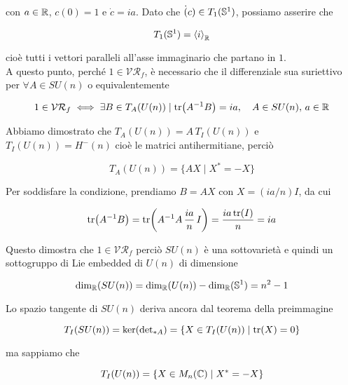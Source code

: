 con $ a \in \R $, $ c(0) = 1 $ e $ \dot{c} = i a $. Dato che $ \dot(c) \in T_{1}(\S^{1}) $, possiamo asserire che

\begin{equation}
	T_{1}(\S^{1}) = \expval{i}_{\R}
\end{equation}

cioè tutti i vettori paralleli all'asse immaginario che partano in $ 1 $.\\
A questo punto, perché $ 1 \in \mathcal{VR}_{f} $, è necessario che il differenziale sua suriettivo per $ \forall A \in SU(n) $ o equivalentemente

\begin{equation}
	1 \in \mathcal{VR}_{f} \iff \exists B \in T_{A}(U(n)) \mid \tr(A^{-1} B) = i a \qcomma A \in SU(n), \, a \in \R
\end{equation}

Abbiamo dimostrato che $ T_{A}(U(n)) = A \, T_{I}(U(n)) $ e $ T_{I}(U(n)) = H^{-}(n) $ cioè le matrici antihermitiane, perciò

\begin{equation}
	T_{A}(U(n)) = \{ AX \mid X^{*} = -X \}
\end{equation}

Per soddisfare la condizione, prendiamo $ B = AX $ con $ X = (i a/n) I $, da cui

\begin{equation}
	\tr(A^{-1} B) = \tr(A^{-1} A \, \dfrac{ia}{n} \, I) = \dfrac{ia \tr(I)}{n} = i a
\end{equation}

Questo dimostra che $ 1 \in \mathcal{VR}_{f} $ perciò $ SU(n) $ è una sottovarietà e quindi un sottogruppo di Lie embedded di $ U(n) $ di dimensione

\begin{equation}
	\dim_{\R}(SU(n)) = \dim_{\R}(U(n)) - \dim_{\R}(\S^{1}) = n^{2} - 1
\end{equation}

Lo spazio tangente di $ SU(n) $ deriva ancora dal teorema della preimmagine

\begin{equation}
	T_{I}(SU(n)) = \ker(\operatorname{det}_{*A}) = \{ X \in T_{I}(U(n)) \mid \tr(X) = 0 \}
\end{equation}

ma sappiamo che

\begin{equation}
	T_{I}(U(n)) = \{ X \in M_{n}(\C) \mid X^{*} = - X \}
\end{equation}


